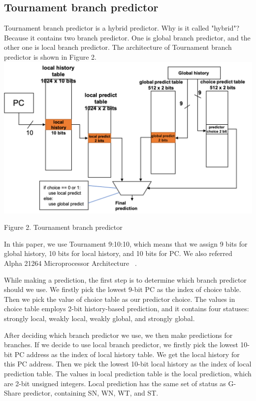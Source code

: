 \documentclass[conference]{IEEEtran}
\begin{document}
\subsection{Tournament branch predictor}
Tournament branch predictor is a hybrid predictor. Why is it called "hybrid"? Because it contains two branch predictor. One is global branch predictor, and the other one is local branch predictor. 
The architecture of Tournament branch predictor is shown in Figure 2. 
\includegraphics[width=\linewidth]{Tournament.png}
\begin{center}
  {\small Figure 2. Tournament branch predictor}
\end{center}
In this paper, we use Tournament 9:10:10, which means that we assign 9 bits for global history, 10 bits for local history, and 10 bits for PC. We also referred Alpha 21264 Microprocessor Architecture ~\cite{nicepaper5}.  

While making a prediction, the first step is to determine which branch predictor should we use. We firstly pick the lowest 9-bit PC as the index of choice table. Then we pick the value of choice table as our predictor choice. 
The values in choice table employs 2-bit history-based prediction, and it contains four statuses: strongly local, weakly local, weakly global, and strongly global. 

After deciding which branch predictor we use, we then make predictions for branches. If we decide to use local branch predictor, we firstly pick the lowest 10-bit PC address as the index of local history table. 
We get the local history for this PC address. Then we pick the lowest 10-bit local history as the index of local prediction table. The values in local prediction table is the local prediction, which are 2-bit unsigned integers. 
Local prediction has the same set of status as G-Share predictor, containing SN, WN, WT, and ST. 
\end{document}
